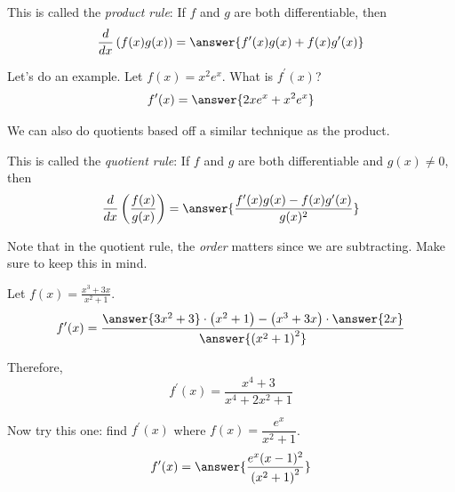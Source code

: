 \documentclass{ximera}
\begin{document}
This is called the \emph{product rule}: If $f$ and $g$ are both differentiable, then
\[
\frac{d}{dx}\left(f(x) g(x)\right)=\answer{f^{\prime}(x) g(x)+f(x) g^{\prime}(x)}
\]

\begin{example}\label{example:5-9}
Let's do an example. Let $f(x)=x^{2} e^{x}$. What is $f^{\prime}(x)$?
\[
f^{\prime}(x)=\answer{2 x e^{x}+x^{2} e^{x}}
\]
\end{example}

We can also do quotients based off a similar technique as the product.
\begin{freeResponse}\end{freeResponse}

This is called the \emph{quotient rule}: If $f$ and $g$ are both differentiable and $g(x) \neq 0$, then
\[
\frac{d}{dx}\left(\frac{f(x)}{g(x)}\right)=\answer{\frac{f^{\prime}(x) g(x)-f(x) g^{\prime}(x)}{g(x)^{2}}}
\]

\begin{warning}
Note that in the quotient rule, the \emph{order} matters since we are subtracting. Make sure to keep this in mind.
\end{warning}

\begin{example}\label{example:5-10}
Let $f(x)=\frac{x^{3}+3 x}{x^{2}+1}$.
\[
f^{\prime}(x)=\frac{\answer{3 x^{2}+3}\cdot\left(x^{2}+1\right)-\left(x^{3}+3 x\right)\cdot\answer{2x}}{\answer{\left(x^{2}+1\right)^{2}}}
\]

Therefore,
\[
f^{\prime}(x)=\frac{x^{4}+3}{x^{4}+2 x^{2}+1}
\]
\end{example}

\begin{exercise}\label{exercise:5-11}
Now try this one: find $f^{\prime}(x)$ where $f(x)=\dfrac{e^{x}}{x^{2}+1}$.
\[
f^{\prime}(x)=\answer{\frac{e^{x}(x-1)^{2}}{\left(x^{2}+1\right)^{2}}}
\]
\end{exercise}
\end{document}
